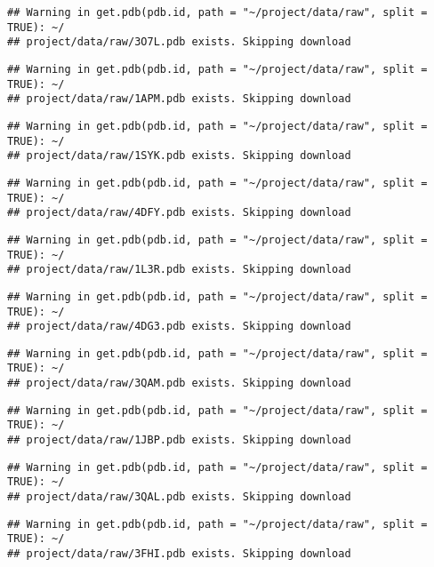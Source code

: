 \documentclass[
]{article}
\begin{document}
\begin{verbatim}
## Warning in get.pdb(pdb.id, path = "~/project/data/raw", split = TRUE): ~/
## project/data/raw/3O7L.pdb exists. Skipping download
\end{verbatim}

\begin{verbatim}
## Warning in get.pdb(pdb.id, path = "~/project/data/raw", split = TRUE): ~/
## project/data/raw/1APM.pdb exists. Skipping download
\end{verbatim}

\begin{verbatim}
## Warning in get.pdb(pdb.id, path = "~/project/data/raw", split = TRUE): ~/
## project/data/raw/1SYK.pdb exists. Skipping download
\end{verbatim}

\begin{verbatim}
## Warning in get.pdb(pdb.id, path = "~/project/data/raw", split = TRUE): ~/
## project/data/raw/4DFY.pdb exists. Skipping download
\end{verbatim}

\begin{verbatim}
## Warning in get.pdb(pdb.id, path = "~/project/data/raw", split = TRUE): ~/
## project/data/raw/1L3R.pdb exists. Skipping download
\end{verbatim}

\begin{verbatim}
## Warning in get.pdb(pdb.id, path = "~/project/data/raw", split = TRUE): ~/
## project/data/raw/4DG3.pdb exists. Skipping download
\end{verbatim}

\begin{verbatim}
## Warning in get.pdb(pdb.id, path = "~/project/data/raw", split = TRUE): ~/
## project/data/raw/3QAM.pdb exists. Skipping download
\end{verbatim}

\begin{verbatim}
## Warning in get.pdb(pdb.id, path = "~/project/data/raw", split = TRUE): ~/
## project/data/raw/1JBP.pdb exists. Skipping download
\end{verbatim}

\begin{verbatim}
## Warning in get.pdb(pdb.id, path = "~/project/data/raw", split = TRUE): ~/
## project/data/raw/3QAL.pdb exists. Skipping download
\end{verbatim}

\begin{verbatim}
## Warning in get.pdb(pdb.id, path = "~/project/data/raw", split = TRUE): ~/
## project/data/raw/3FHI.pdb exists. Skipping download
\end{verbatim}
\end{document}
